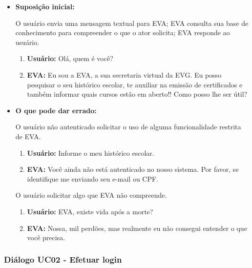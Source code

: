 \begin{itemize}
    \item \textbf{Suposição inicial:}
    
    O usuário envia uma mensagem textual para EVA; EVA consulta sua base de conhecimento para compreender o que o ator solicita; EVA responde ao usuário.
    
    \begin{enumerate}
        \item \textbf{Usuário:} Olá, quem é você?
        \item \textbf{EVA:} Eu sou a EVA, a sua secretaria virtual da EVG. Eu posso pesquisar o seu histórico escolar, te auxiliar na emissão de certificados e também informar quais cursos estão em aberto!! Como posso lhe ser útil?
    \end{enumerate}
    
    \item \textbf{O que pode dar errado:}
    
    O usuário não autenticado solicitar o uso de alguma funcionalidade restrita de EVA.
    
        \begin{enumerate}
            \item \textbf{Usuário:} Informe o meu histórico escolar.
            \item \textbf{EVA:} Você ainda não está autenticado no nosso sistema. Por favor, se identifique me enviando seu e-mail ou CPF.
        \end{enumerate}
    
    O usuário solicitar algo que EVA não compreende.
    
        \begin{enumerate}
            \item \textbf{Usuário:} EVA, existe vida após a morte?
            \item \textbf{EVA:} Nossa, mil perdões, mas realmente eu não consegui entender o que você precisa.
        \end{enumerate}
\end{itemize}

\subsubsection{Diálogo UC02 - Efetuar login}

